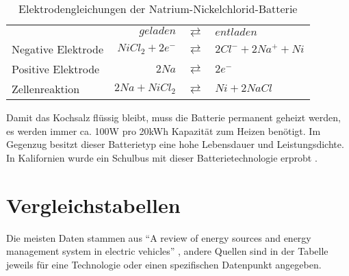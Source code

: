 \begin{table}\centering
  \begin{tabularx}{\linewidth}{XrcX}
  	                   &       $geladen$ & $\rightleftarrows$ & $entladen$           \\
  	Negative Elektrode & $NiCl_2 + 2e^-$ & $\rightleftarrows$ & $2Cl^- + 2Na^+ + Ni$ \\
  	Positive Elektrode &           $2Na$ & $\rightleftarrows$ & $2e^-$               \\ \midrule
  	Zellenreaktion     &  $2Na + NiCl_2$ & $\rightleftarrows$ & $Ni + 2NaCl$
  \end{tabularx}
  \caption{Elektrodengleichungen der Natrium-Nickelchlorid-Batterie}
  \label{ZEBRA}
\end{table}

Damit das Kochsalz flüssig bleibt, muss die Batterie permanent geheizt werden, es werden immer ca. 100W pro 20kWh Kapazität zum Heizen benötigt. Im Gegenzug besitzt dieser Batterietyp eine hohe Lebensdauer und Leistungsdichte. In Kalifornien wurde ein Schulbus mit dieser Batterietechnologie erprobt \cite{Electric-Transportation-Department:2004}.

\section{Vergleichstabellen}   %
\label{vergleichstabellen_speichertechnologien}

Die meisten Daten stammen aus "`A review of energy sources and energy management system in electric vehicles"' \cite{Tie201382}, andere Quellen sind in der Tabelle jeweils für eine Technologie oder einen spezifischen Datenpunkt angegeben.

